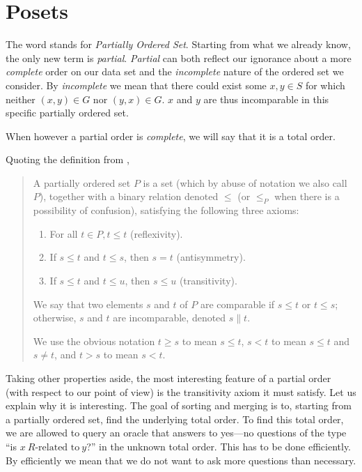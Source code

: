 \section{Posets}

The word  stands for \emph{Partially Ordered Set}. Starting from what we already know, the only new term is \emph{partial}. \emph{Partial} can both reflect our ignorance about a more \emph{complete} order on our data set and the \emph{incomplete} nature of the ordered set we consider. By \emph{incomplete} we mean that there could exist some $x, y \in S$ for which neither $(x, y) \in G$ nor $(y, x) \in G$. $x$ and $y$ are thus incomparable in this specific partially ordered set.


When however a partial order is \emph{complete}, we will say that it is a total order.

Quoting the definition from \cite{Stanley:2011:ECV:2124415},

\begin{quotation}

A partially ordered set $P$ is a set (which by abuse of notation we also call $P$), together with a binary relation denoted $\leq$ (or $\leq_P$ when there is a possibility of confusion), satisfying the following three axioms:

\begin{enumerate}
\item For all $t \in P, t \leq t$ (reflexivity).
\item If $s \leq t$ and $t \leq s$, then $s = t$ (antisymmetry).
\item If $s \leq t$ and $t \leq u$, then $s \leq u$ (transitivity).
\end{enumerate}

We say that two elements $s$ and $t$ of $P$ are comparable if $s \leq t$ or $t \leq s$; otherwise, $s$ and $t$ are incomparable, denoted $s \parallel t$.

We use the obvious notation $t \geq s$ to mean $s \leq t$, $s < t$ to mean $s \leq t$ and $s \neq t$, and $t > s$ to mean $s < t$.

\end{quotation}

Taking other properties aside, the most interesting feature of a partial order (with respect to our point of view) is the transitivity axiom it must satisfy. Let us explain why it is interesting. The goal of sorting and merging is to, starting from a partially ordered set, find the underlying total order. To find this total order, we are allowed to query an oracle that answers to yes---no questions of the type ``is $x~R\text{-related to}~y$?'' in the unknown total order. This has to be done efficiently. By efficiently we mean that we do not want to ask more questions than necessary.

